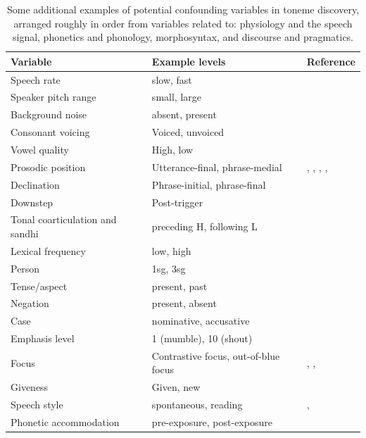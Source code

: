 \documentclass[12pt]{article}
\begin{document}
\begin{table}[!h]
  \centering
  \begin{tabular}{p{1.5in} | p{1.8in} p{2.4in}}
    Variable & Example levels & Reference\\\hline
    Speech rate &  slow, fast & \citet{Fougeron:1998,Gandour:1999,Kuo:2007} \\
    Speaker pitch range & small, large & \citet[p.\ 175]{Baken:2000}
    \\
    Background noise & absent, present & \citet{Zhao:2009} \\
    Consonant voicing &  Voiced, unvoiced  & \citet{Hombert:1978} \\
    Vowel quality &  High, low & \citet{Connell:2002,Hombert:1978}\\
    Prosodic position  & Utterance-final, phrase-medial  & \citet[p.\
    45-46]{Maddieson:1978}, \cite{Hayes:1989}, \cite{Shattuck-Hufnagel:1996}, \citet{Zsiga:2007}, \cite[Ch.\ 6]{Gussenhoven:2004} \\
    Declination  & Phrase-initial, phrase-final & \cite[Ch.\ 6]{Gussenhoven:2004} \\
    Downstep & Post-trigger & \cite[Ch.\ 6]{Gussenhoven:2004} \\
    Tonal coarticulation and sandhi  & preceding H, following L
    & \citet{Xu:1997a,Chen:2000,Kuo:2007}  \\
    Lexical frequency  & low, high & \citet{Zhao:2009} \\
    Person & 1sg, 3sg  & \citet[p.\ 203]{Hyman:2011b} \\
    Tense/aspect  & present, past  & \citet[p.\ 203]{Hyman:2011b} \\
    Negation  & present, absent  & \citet[p.\ 203]{Hyman:2011b} \\
    Case  & nominative, accusative & \citet[p.\ 203]{Hyman:2011b}\\
    Emphasis level  & 1 (mumble), 10 (shout)  &
    \citet{Liberman:1984}\\
    Focus & Contrastive focus, out-of-blue focus  &
    \citet{Katz:2011}, \citet{Eady:1986}, \citet{Jun:2005}\\
    Giveness  & Given, new  &
    \citet{Katz:2011}\\
    Speech style  & spontaneous, reading &
    \citet{fernald:1984}, \citet[p.\ 175-176]{Baken:2000}\\
    Phonetic accommodation  & pre-exposure, post-exposure  & \citet{Babel:2012,Babel:2012a}\\
  \end{tabular}
  \caption{Some additional examples of potential confounding variables in
    toneme discovery, arranged roughly in order from variables related
    to: physiology and the speech signal, phonetics and phonology,
    morphosyntax, and discourse and pragmatics.}
  \label{tab:confounds}
\end{table}
\end{document}
